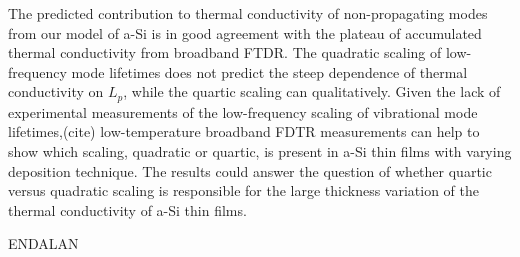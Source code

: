 \documentclass[aps,prb,onecolumn,preprint,superscriptaddress,footinbib,amsmath,amssymb,floatfix]{revtex4}
\begin{document}
The predicted contribution to thermal conductivity of 
non-propagating modes from our model of a-Si is in good agreement 
with the plateau of accumulated thermal conductivity from broadband 
FTDR. The quadratic scaling of low-frequency mode lifetimes 
does not predict the steep dependence of thermal conductivity on
$L_p$, while the quartic scaling can qualitatively. Given the 
lack of experimental measurements of the low-frequency scaling of 
vibrational mode lifetimes,(cite) low-temperature broadband FDTR 
measurements can help to show which scaling, quadratic or 
quartic, is present in a-Si thin films with varying deposition 
technique. The results could answer the question of whether 
quartic versus quadratic scaling is responsible for the large 
thickness variation of the thermal conductivity of a-Si thin films. 

ENDALAN
\end{document}

